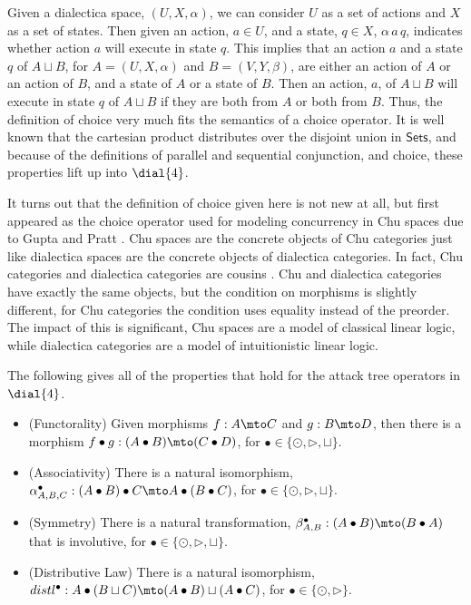 Given a dialectica space, $(U, X, \alpha)$, we can consider $U$ as a
set of actions and $X$ as a set of states.  Then given an action, $a
\in U$, and a state, $q \in X$, $\alpha\,a\,q$, indicates whether
action $a$ will execute in state $q$.  This implies that an action $a$
and a state $q$ of $A \sqcup B$, for $A = (U , X , \alpha)$ and $B =
(V , Y , \beta)$, are either an action of $A$ or an action of $B$, and
a state of $A$ or a state of $B$.  Then an action, $a$, of $A \sqcup
B$ will execute in state $q$ of $A \sqcup B$ if they are both from $A$
or both from $B$.  Thus, the definition of choice very much fits the
semantics of a choice operator.  It is well known that the cartesian
product distributes over the disjoint union in $\mathsf{Sets}$, and
because of the definitions of parallel and sequential conjunction, and
choice, these properties lift up into $\dial{4}$.

It turns out that the definition of choice given here is not new at
all, but first appeared as the choice operator used for modeling
concurrency in Chu spaces due to Gupta and Pratt \cite{Gupta:1994}.
Chu spaces are the concrete objects of Chu categories just like
dialectica spaces are the concrete objects of dialectica categories.
In fact, Chu categories and dialectica categories are cousins
\cite{dePaiva:2006b}.  Chu and dialectica categories have exactly the
same objects, but the condition on morphisms is slightly different,
for Chu categories the condition uses equality instead of the
preorder.  The impact of this is significant, Chu spaces are a model
of classical linear logic, while dialectica categories are a model of
intuitionistic linear logic.  

The following gives all of the properties that hold for the attack
tree operators in $\dial{4}$.
\begin{lemma}
  \label{lemma:properties_of_the_attack_tree_operators_in_dial4}
  \begin{itemize}
  \item[] (Functorality) Given morphisms $f : A \mto C$ and
    $g : B \mto D$, then there is a morphism $f \bullet g : (A \bullet B) \mto (C \bullet D)$, for $\bullet \in \{\odot, \rhd, \sqcup\}$.\\[-5px]
  \item[] (Associativity) There is a natural isomorphism, $\alpha^\bullet_{A,B,C} : (A \bullet B) \bullet C \mto A \bullet (B \bullet C)$, for $\bullet \in \{\odot, \rhd, \sqcup\}$.\\[-5px]
  \item[] (Symmetry) There is a natural transformation, $\beta^\bullet_{A,B} : (A \bullet B) \mto (B \bullet A)$ that is involutive, for $\bullet \in \{\odot, \rhd, \sqcup\}$.\\[-5px]
  \item[] (Distributive Law) There is a natural isomorphism, $distl^\bullet : A \bullet (B \sqcup C) \mto (A \bullet B) \sqcup (A \bullet C)$, for $\bullet \in \{\odot, \rhd\}$.\\[-5px]
  \end{itemize}
\end{lemma}

